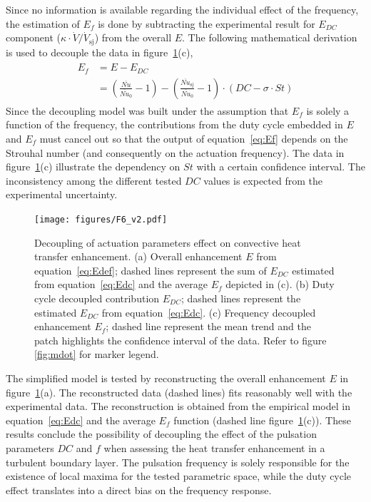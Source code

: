Since no information is available regarding the individual effect of the frequency, the estimation of $E_f$ is done by subtracting the experimental result for $E_{DC}$ component ($\kappa\cdot \dot{V}/\dot{V}_{\mathrm{sj}}$) from the overall $E$. The following mathematical derivation is used to decouple the data in figure~\ref{fig:Enhancement}(c),
%
\begin{align}\label{eq:Ef}
\begin{split}
      E_f & = E - E_{DC} \\
          & = \left(\frac{\overline{Nu}}{\overline{Nu}_0}-1\right) - \left(\frac{\overline{Nu}_{\mathrm{sj}}}{\overline{Nu}_0}-1\right) \cdot \left(DC - \sigma \cdot St\right)
\end{split}
\end{align}
%
Since the decoupling model was built under the assumption that $E_f$ is solely a function of the frequency, the contributions from the duty cycle embedded in $E$ and $E_f$ must cancel out so that the output of equation~\ref{eq:Ef} depends on the Strouhal number (and consequently on the actuation frequency). The data in figure~\ref{fig:Enhancement}(c) illustrate the dependency on $St$ with a certain confidence interval. The inconsistency among the different tested $DC$ values is expected from the experimental uncertainty. 

\begin{figure}[] %
    \centering
    \texttt{[image: figures/F6\_v2.pdf]}
    \caption{Decoupling of actuation parameters effect on convective heat transfer enhancement. 
    (a) Overall enhancement $E$ from equation~\ref{eq:Edef}; dashed lines  represent the sum of $E_{DC}$ estimated from equation~\ref{eq:Edc} and the average $E_f$ depicted in (c).
    (b) Duty cycle decoupled contribution  $E_{DC}$; dashed lines  represent the estimated $E_{DC}$ from equation~\ref{eq:Edc}.
    (c) Frequency decoupled enhancement $E_f$; dashed line  represent the mean trend and the patch  highlights the confidence interval of the data.
    Refer to figure \ref{fig:mdot} for marker legend.}
    \label{fig:Enhancement}
\end{figure}

The simplified model is tested by reconstructing the overall enhancement $E$ in figure~\ref{fig:Enhancement}(a). The reconstructed data (dashed lines) fits reasonably well with the experimental data. The reconstruction is obtained from the empirical model in equation~\ref{eq:Edc} and the average $E_f$ function (dashed line figure~\ref{fig:Enhancement}(c)). These results conclude the possibility of decoupling the effect of the pulsation parameters $DC$ and $f$ when assessing the heat transfer enhancement in a turbulent boundary layer. The pulsation frequency is solely responsible for the existence of local maxima for the tested parametric space, while the duty cycle effect translates into a direct bias on the frequency response.

